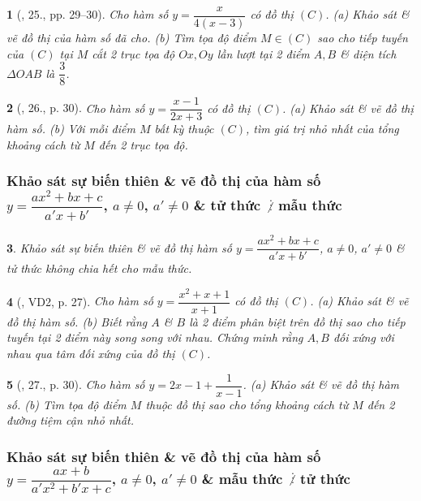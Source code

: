 \documentclass{article}
\newtheorem{baitoan}{}
\begin{document}
\begin{baitoan}[\cite{TLCT_giai_tich_12}, 25., pp. 29--30]
	Cho hàm số $y = \dfrac{x}{4(x - 3)}$ có đồ thị $(C)$. (a) Khảo sát \& vẽ đồ thị của hàm số đã cho. (b) Tìm tọa độ điểm $M\in(C)$ sao cho tiếp tuyến của $(C)$ tại $M$ cắt 2 trục tọa độ $Ox,Oy$ lần lượt tại 2 điểm $A,B$ \& diện tích $\Delta OAB$ là $\dfrac{3}{8}$.	
\end{baitoan}

\begin{baitoan}[\cite{TLCT_giai_tich_12}, 26., p. 30]
	Cho hàm số $y = \dfrac{x - 1}{2x + 3}$ có đồ thị $(C)$. (a) Khảo sát \& vẽ đồ thị hàm số. (b) Với mỗi điểm $M$ bất kỳ thuộc $(C)$, tìm giá trị nhỏ nhất của tổng khoảng cách từ $M$ đến 2 trục tọa độ.	
\end{baitoan}

\subsubsection{Khảo sát sự biến thiên \& vẽ đồ thị của hàm số $y = \dfrac{ax^2 + bx + c}{a'x + b'}$, $a\ne 0$, $a'\ne 0$ \& tử thức $\not\vdots$ mẫu thức}

\begin{baitoan}
	Khảo sát sự biến thiên \& vẽ đồ thị hàm số $y = \dfrac{ax^2 + bx + c}{a'x + b'}$, $a\ne 0$, $a'\ne 0$ \& tử thức không chia hết cho mẫu thức.
\end{baitoan}

\begin{baitoan}[\cite{TLCT_giai_tich_12}, VD2, p. 27]
	Cho hàm số $y = \dfrac{x^2 + x + 1}{x + 1}$ có đồ thị $(C)$. (a) Khảo sát \& vẽ đồ thị hàm số. (b) Biết rằng $A$ \& $B$ là 2 điểm phân biệt trên đồ thị sao cho tiếp tuyến tại 2 điểm này song song với nhau. Chứng minh rằng $A,B$ đối xứng với nhau qua tâm đối xứng của đồ thị $(C)$.	
\end{baitoan}

\begin{baitoan}[\cite{TLCT_giai_tich_12}, 27., p. 30]
	Cho hàm số $y = 2x - 1 + \dfrac{1}{x - 1}$. (a) Khảo sát \& vẽ đồ thị hàm số. (b) Tìm tọa độ điểm $M$ thuộc đồ thị sao cho tổng khoảng cách từ $M$ đến 2 đường tiệm cận nhỏ nhất.	
\end{baitoan}

\subsubsection{Khảo sát sự biến thiên \& vẽ đồ thị của hàm số $y = \dfrac{ax + b}{a'x^2 + b'x + c}$, $a\ne 0$, $a'\ne 0$ \& mẫu thức $\not\vdots$ tử thức}
\end{document}
